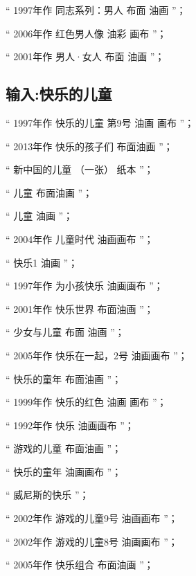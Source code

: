 \documentclass[master,oneside]{zjuthesis}
\begin{document}
“ 1997年作 同志系列：男人 布面 油画 ”；

“ 2006年作 红色男人像 油彩 画布 ”；

“ 2001年作 男人·女人 布面 油画 ”；
\subsection{输入:快乐的儿童}
“ 1997年作 快乐的儿童 第9号 油画 画布 ”；

“ 2013年作 快乐的孩子们 布面油画 ”；

“ 新中国的儿童 （一张） 纸本 ”；

“ 儿童 布面油画 ”；

“ 儿童 油画 ”；

“ 2004年作 儿童时代 油画画布 ”；

“ 快乐1 油画 ”；

“ 1997年作 为小孩快乐 油画画布 ”；

“ 2001年作 快乐世界 布面油画 ”；

“ 少女与儿童 布面 油画 ”；

“ 2005年作 快乐在一起，2号 油画画布 ”；

“ 快乐的童年 布面油画 ”；

“ 1999年作 快乐的红色 油画 画布 ”；

“ 1992年作 快乐 油画画布 ”；

“ 游戏的儿童 布面油画 ”；

“ 快乐的童年 油画画布 ”；

“ 威尼斯的快乐 ”；

“ 2002年作 游戏的儿童9号 油画画布 ”；

“ 2002年作 游戏的儿童8号 油画画布 ”；

“ 2005年作 快乐组合 布面油画 ”；

\end{document}
